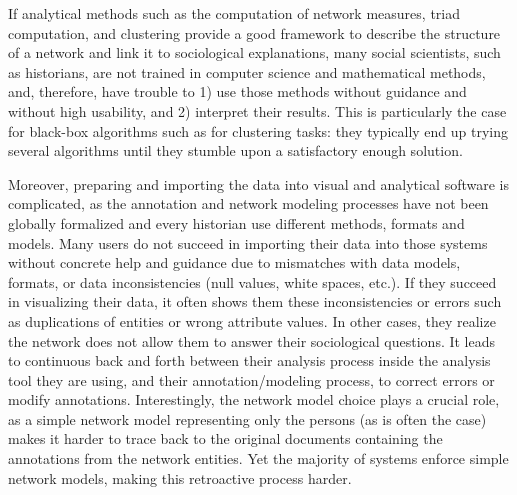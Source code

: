 If analytical methods such as the computation of network measures, triad computation, and clustering provide a good framework to describe the structure of a network and link it to sociological explanations\cite{wassermanSocialNetworkAnalysis1994, scottSocialNetworkAnalysis1988}, many social scientists, such as historians, are not trained in computer science and mathematical methods, and, therefore, have trouble to 1) use those methods without guidance and without high usability\cite{rollingerProlegomenaProblemsPerspectives2020, alkadi2022}, and 2) interpret their results.
This is particularly the case for black-box algorithms such as for clustering tasks: they typically end up trying several algorithms until they stumble upon a satisfactory enough solution\cite{pisterIntegratingPriorKnowledge2021}.



Moreover, preparing and importing the data into visual and analytical software is complicated, as the annotation and network modeling processes have not been globally formalized and every historian use different methods, formats and models.
Many users do not succeed in importing their data into those systems without concrete help and guidance\cite{serranomolineroUnderstandingUseVistorian2017, alkadi2022} due to mismatches with data models, formats, or data inconsistencies (null values, white spaces, etc.).
If they succeed in visualizing their data, it often shows them these inconsistencies or errors such as duplications of entities or wrong attribute values.
In other cases, they realize the network does not allow them to answer their sociological questions\cite{lemercier12FormalNetwork2015}.
It leads to continuous back and forth between their analysis process inside the analysis tool they are using, and their annotation/modeling process, to correct errors or modify annotations.
Interestingly, the network model choice plays a crucial role, as a simple network model representing only the persons (as is often the case) makes it harder to trace back to the original documents containing the annotations from the network entities.
Yet the majority of \sna systems enforce simple network models, making this retroactive process harder.

